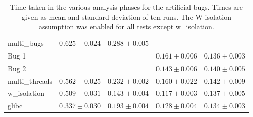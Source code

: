\begin{sidewaystable}
\begin{tabular}{lllll}
    multi\_bugs                    & $0.625 \pm 0.024$ &  $0.288 \pm 0.005$ & \\
    \hspace{5mm}Bug 1 & & &  $0.161 \pm 0.006$ &  $0.136 \pm 0.003$\\
    \hspace{5mm}Bug 2 & & &  $0.143 \pm 0.006$ &  $0.140 \pm 0.005$\\
    multi\_threads                 & $0.562 \pm 0.025$ &  $0.232 \pm 0.002$ &  $0.160 \pm 0.022$ &  $0.142 \pm 0.009$\\
    w\_isolation                   & $0.509 \pm 0.031$ &  $0.143 \pm 0.004$ &  $0.117 \pm 0.003$ &  $0.137 \pm 0.005$\\
    glibc                          & $0.337 \pm 0.030$ &  $0.193 \pm 0.004$ &  $0.128 \pm 0.004$ &  $0.134 \pm 0.003$\\
  \end{tabular}
  \caption{Time taken in the various analysis phases for the
    artificial bugs.  Times are given as mean and standard deviation
    of ten runs.  The W isolation assumption was enabled for all tests
    except w\_isolation.}
  \label{table:eval:summary_analysis_times}
\end{sidewaystable}

